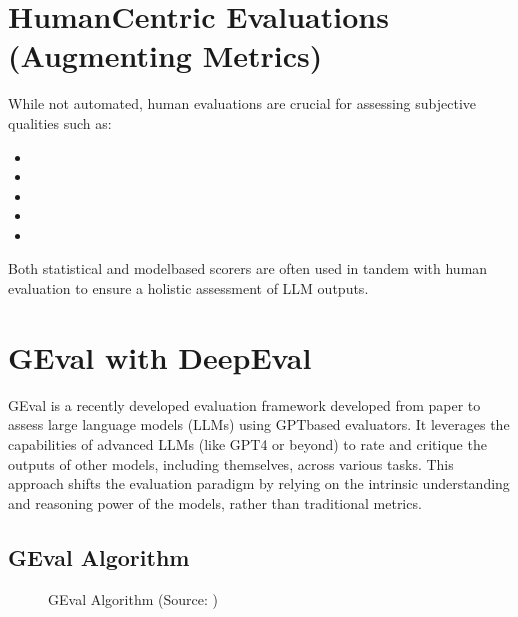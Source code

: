 \documentclass[letterpaper,11pt,english]{sphinxmanual}
\begin{document}
\section{Human\sphinxhyphen{}Centric Evaluations (Augmenting Metrics)}
\label{\detokenize{evaluation:human-centric-evaluations-augmenting-metrics}}
\sphinxAtStartPar
While not automated, human evaluations are crucial for assessing subjective qualities such as:
\begin{itemize}
\item {} 
\sphinxAtStartPar
{}

\item {} 
\sphinxAtStartPar
{}

\item {} 
\sphinxAtStartPar
{}

\item {} 
\sphinxAtStartPar
{}

\item {} 
\sphinxAtStartPar
{}

\end{itemize}

\sphinxAtStartPar
Both statistical and model\sphinxhyphen{}based scorers are often used in tandem with human evaluation to ensure a holistic assessment of LLM outputs.


\section{GEval with DeepEval}
\label{\detokenize{evaluation:geval-with-deepeval}}\label{\detokenize{evaluation:geval}}
\sphinxAtStartPar
G\sphinxhyphen{}Eval is a recently developed evaluation framework developed from paper  to assess large language models (LLMs) using GPT\sphinxhyphen{}based evaluators.
It leverages the capabilities of advanced LLMs (like GPT\sphinxhyphen{}4 or beyond) to rate and critique the outputs of other models, including themselves,
across various tasks. This approach shifts the evaluation paradigm by relying on the intrinsic understanding and reasoning power of the models,
rather than traditional metrics.


\subsection{G\sphinxhyphen{}Eval Algorithm}
\label{\detokenize{evaluation:g-eval-algorithm}}
\begin{figure}[htbp]
\centering
\capstart

\noindent{}
\caption{G\sphinxhyphen{}Eval Algorithm (Source: )}\label{\detokenize{evaluation:id4}}\label{\detokenize{evaluation:fig-geval}}\end{figure}
\end{document}
